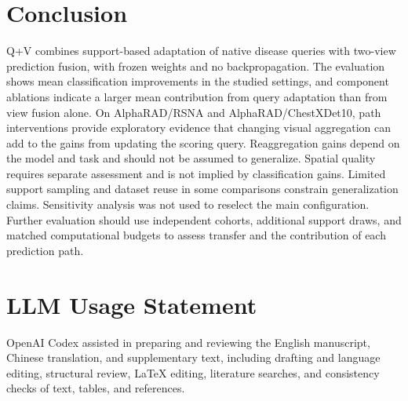 \documentclass[10pt,twocolumn,letterpaper]{article}
\begin{document}
\section{Conclusion}
Q+V combines support-based adaptation of native disease queries with two-view prediction fusion, with frozen weights and no backpropagation. The evaluation shows mean classification improvements in the studied settings, and component ablations indicate a larger mean contribution from query adaptation than from view fusion alone. On AlphaRAD/RSNA and AlphaRAD/ChestXDet10, path interventions provide exploratory evidence that changing visual aggregation can add to the gains from updating the scoring query. Reaggregation gains depend on the model and task and should not be assumed to generalize. Spatial quality requires separate assessment and is not implied by classification gains. Limited support sampling and dataset reuse in some comparisons constrain generalization claims. Sensitivity analysis was not used to reselect the main configuration. Further evaluation should use independent cohorts, additional support draws, and matched computational budgets to assess transfer and the contribution of each prediction path.

\clearpage
\section*{LLM Usage Statement}
OpenAI Codex assisted in preparing and reviewing the English manuscript, Chinese translation, and supplementary text, including drafting and language editing, structural review, LaTeX editing, literature searches, and consistency checks of text, tables, and references.
{
\small


}
\ifdefined{}

\fi
\end{document}
